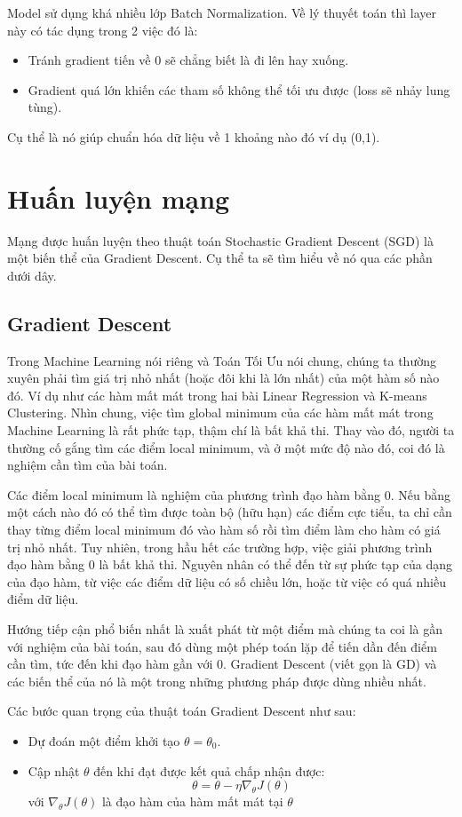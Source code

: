 Model sử dụng khá nhiều lớp Batch Normalization. Về lý thuyết toán thì layer này có tác dụng trong 2 việc đó là:
\begin{itemize}
\item Tránh gradient tiến về 0 sẽ chẳng biết là đi lên hay xuống.
\item Gradient quá lớn khiến các tham số không thể tối ưu được (loss sẽ nhảy lung tùng).
\end{itemize}
Cụ thể là nó giúp chuẩn hóa dữ liệu về 1 khoảng nào đó ví dụ (0,1).

\section{Huấn luyện mạng}
Mạng được huấn luyện theo thuật toán Stochastic Gradient Descent (SGD) là một biến thể của Gradient Descent. Cụ thể ta sẽ tìm hiểu về nó qua các phần dưới dây.

\subsection{Gradient Descent}
Trong Machine Learning nói riêng và Toán Tối Ưu nói chung, chúng ta thường xuyên phải tìm giá trị nhỏ nhất (hoặc đôi khi là lớn nhất) của một hàm số nào đó. Ví dụ như các hàm mất mát trong hai bài Linear Regression và K-means Clustering. Nhìn chung, việc tìm global minimum của các hàm mất mát trong Machine Learning là rất phức tạp, thậm chí là bất khả thi. Thay vào đó, người ta thường cố gắng tìm các điểm local minimum, và ở một mức độ nào đó, coi đó là nghiệm cần tìm của bài toán.

Các điểm local minimum là nghiệm của phương trình đạo hàm bằng 0. Nếu bằng một cách nào đó có thể tìm được toàn bộ (hữu hạn) các điểm cực tiểu, ta chỉ cần thay từng điểm local minimum đó vào hàm số rồi tìm điểm làm cho hàm có giá trị nhỏ nhất. Tuy nhiên, trong hầu hết các trường hợp, việc giải phương trình đạo hàm bằng 0 là bất khả thi. Nguyên nhân có thể đến từ sự phức tạp của dạng của đạo hàm, từ việc các điểm dữ liệu có số chiều lớn, hoặc từ việc có quá nhiều điểm dữ liệu.

Hướng tiếp cận phổ biến nhất là xuất phát từ một điểm mà chúng ta coi là gần với nghiệm của bài toán, sau đó dùng một phép toán lặp để tiến dần đến điểm cần tìm, tức đến khi đạo hàm gần với 0. Gradient Descent (viết gọn là GD) và các biến thể của nó là một trong những phương pháp được dùng nhiều nhất.

Các bước quan trọng của thuật toán Gradient Descent như sau:
\begin{itemize}
\item Dự đoán một điểm khởi tạo $\theta = \theta_0$.
\item Cập nhật $\theta$ đến khi đạt được kết quả chấp nhận được: 
$$\theta = \theta - \eta \nabla_{\theta}J(\theta)$$
với $\nabla_{\theta}J(\theta)$ là đạo hàm của hàm mất mát tại $\theta$
\end{itemize}


